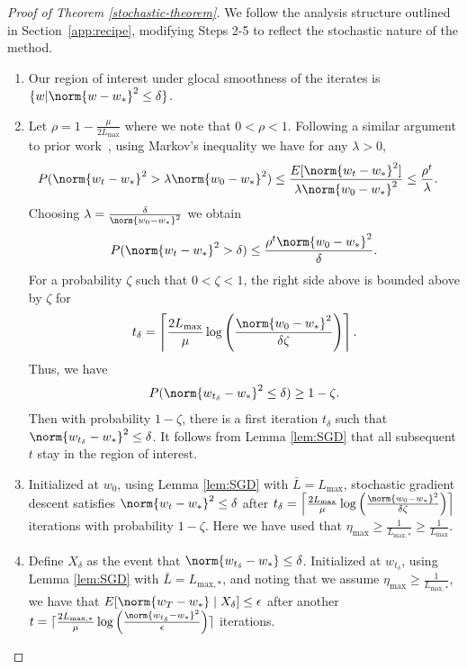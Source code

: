 \documentclass[10pt]{article} %
\begin{document}
\begin{proof}[Proof of Theorem \ref{stochastic-theorem}]
We follow the analysis structure outlined in Section~\ref{app:recipe}, modifying Steps 2-5 to reflect the stochastic nature of the method.
    \begin{enumerate}
    \item Our region of interest under glocal smoothness of the iterates is $\{w \vert \norm{w - w_*}^2 \leq \delta \}$.
    \item Let $\rho = 1 - \frac{\mu}{2L_{\text{max}}}$ where we note that $0 < \rho < 1$. Following a similar argument to prior work~\cite[Theorem~5]{konevcny2017semi}, using Markov's inequality we have for any $\lambda > 0$,
      \begin{align*}
          P(\norm{w_{t} - w_{*}}^2 > \lambda\norm{w_0 - w_{*}}^2)
           & \leq \frac{E[\norm{w_{t} - w_{*}}^2]}{\lambda\norm{w_0 - w_{*}}^2} \leq \frac{\rho^{t}}{\lambda}.
      \end{align*}
    Choosing $\lambda = \frac{\delta}{\norm{w_0 - w_*}^2}$ we obtain 
    \[
    P(\norm{w_{t} - w_{*}}^2 > \delta) \leq \frac{\rho^t\norm{w_0 - w_*}^2}{\delta}.
    \]
    For a probability $\zeta$ such that $0 < \zeta < 1$, the right side above is bounded above by $\zeta$ for
              \begin{align*}
              \label{eq:SGDic-hp}
                  t_\delta = \left\lceil\frac{2L_{\text{max}}}{\mu}\log\left(\frac{\norm{w_0 - w_*}^2}{\delta\zeta}\right)\right\rceil.
              \end{align*} Thus, we have
              \begin{align*}
                  P(\norm{w_{t_\delta} - w_{*}}^2  \leq \delta) \geq 1 - \zeta.
              \end{align*} 
    Then with probability $1 - \zeta$, there is a first iteration $t_\delta$ such that $\norm{w_{t_\delta} - w_{*}}^2 \leq \delta$. It follows from Lemma \ref{lem:SGD} that all subsequent $t$ stay in the region of interest.
    \item Initialized at $w_0$, using Lemma \ref{lem:SGD} with $\bar{L} = L_{\text{max}}$, stochastic gradient descent satisfies $\norm{w_t - w_*}^2 \leq \delta$ after $t_\delta = \left\lceil\frac{2L_{\text{max}}}{\mu}\log\left(\frac{\norm{w_0 - w_*}^2}{\delta\zeta}\right)\right\rceil$ iterations with probability $1 - \zeta$. Here we have used that $\eta_\text{max} \geq \frac{1}{L_{\text{max}, *}} \geq \frac{1}{L_{\text{max}}}$.
    \item Define $X_{\delta}$ as the event that $\norm{w_{t_{\delta}} - w_{*}} \leq \delta$. Initialized at $w_{t_\delta}$, using Lemma \ref{lem:SGD} with $\bar{L} = L_{\text{max}, *}$, and noting that we assume $\eta_\text{max} \geq \frac{1}{L_{\text{max}, *}}$, we have that $E[\norm{w_{T} - w_{*}} \;|\;X_{\delta}] \leq \epsilon$ after another $t = \lceil \frac{2L_{\text{max}, *}}{\mu}\log\left(\frac{\norm{w_{t_\delta} - w_{*}}^2}{\epsilon}\right) \rceil$ iterations.

\end{enumerate}
\end{proof}
\end{document}
